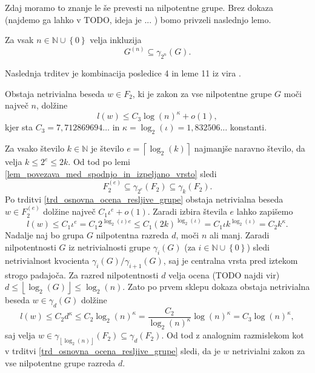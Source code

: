 \documentclass[mat1, tisk]{fmfdelo}
\numberwithin{equation}{section}  %
\begin{document}
Zdaj moramo to znanje le še prevesti na nilpotentne grupe. Brez dokaza (najdemo ga lahko v TODO, ideja je ... ) bomo privzeli naslednjo lemo. 

\begin{lema}
\label{lem_povezava_med_spodnjo_in_izpeljano_vrsto}
Za vsak $n \in \mathbb{N} \cup \left\{ 0\right\} $ velja inkluzija
\begin{equation*}
G^{(n)} \subseteq \gamma_{2^{n}}(G).
\end{equation*}    
\end{lema}

Naslednja trditev je kombinacija posledice 4 in leme 11 iz vira \cite{Schneider_2016}.

\begin{trditev}
\label{trd_koncna_ugotovitev_nilpotentne_v_nalogi}
 Obstaja netrivialna beseda $w \in F_2$, ki je zakon za vse nilpotentne grupe $G$ moči največ $n$, dolžine \begin{equation*}
 l(w) \le  C_3 \log(n)^{\kappa} + o(1),
 \end{equation*}  
 kjer sta $C_3 = 7{,}712869694 \ldots$ in $\kappa = \log_2(\iota) = 1{,}832506 \ldots$ konstanti.    
\end{trditev}

\begin{dokaz}
    Za vsako število $k \in  \mathbb{N}$ je
    število $e = \left\lceil \log_2(k) \right\rceil$ najmanjše naravno število, da velja $k \le 2^{e} \le 2k$.
    Od tod po lemi \ref{lem_povezava_med_spodnjo_in_izpeljano_vrsto} sledi \begin{equation*}
    F_2^{(e)} \subseteq \gamma_{2^{e}}(F_2) \subseteq \gamma_k(F_2).
    \end{equation*}  
     Po trditvi \ref{trd_osnovna_ocena_resljive_grupe} obstaja netrivialna beseda $w \in  F_2^{(e)}$ dolžine največ $C_1 \iota^{e} + o(1)$.
    Zaradi izbira števila $e$ lahko zapišemo \begin{equation*}
    l(w) \le  C_1 \iota^{e} = C_1 2^{\log_2(\iota) e} \le C_1 (2k)^{\log_2(\iota)} = C_1 \iota k^{\log_2(\iota)} = C_2  k^\kappa.
    \end{equation*}
    Nadalje naj bo grupa $G$ nilpotentna razreda $d$, moči $n$ ali manj. Zaradi nilpotentnosti $G$ iz netrivialnosti grupe $\gamma_i(G)$ (za $i \in \mathbb{N} \cup \left\{ 0 \right\}$) sledi netrivialnost kvocienta $\gamma_i(G) / \gamma_{i + 1}(G)$, saj je centralna vrsta pred iztekom strogo padajoča.
    Za razred nilpotentnosti $d$ velja ocena (TODO najdi vir) $d \le \left\lfloor \log_2(G)  \right\rfloor \le \log_2(n)$. Zato po prvem sklepu dokaza obstaja netrivialna beseda $w \in \gamma_d(G)$ dolžine \begin{equation*}
    l(w) \le C_2 d^{\kappa} \le C_2 \log_2(n)^{\kappa} = \frac{C_2}{\log_2(n)^{\kappa}} \log(n)^{\kappa} = C_3 \log(n)^{\kappa}, 
    \end{equation*}  
     saj velja $w \in \gamma_{\left\lfloor \log_2(n) \right\rfloor}(F_2) \subseteq \gamma_{d}(F_2)$. Od tod z analognim razmislekom kot v trditvi \ref{trd_osnovna_ocena_resljive_grupe} sledi, da je $w$ netrivialni zakon za vse nilpotentne grupe razreda $d$. 
\end{dokaz}
\end{document}
